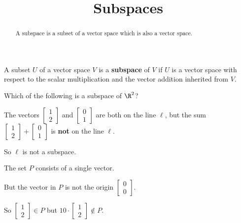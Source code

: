 \documentclass{ximera}
\title{Subspaces}
\begin{document}
\begin{abstract}
  A subspace is a subset of a vector space which is also a vector space.
\end{abstract}\maketitle

\begin{definition}
  A subset $U$ of a vector space $V$ is a \textbf{subspace} of $V$ if
  $U$ is a vector space with respect to the scalar multiplication and
  the vector addition inherited from $V$.
\end{definition}

\begin{question}
  Which of the following is a subspace of $\R^2$?
  \begin{solution}
    \begin{hint}
      The vectors $\begin{bmatrix} 1 \\ 2\end{bmatrix}$ and $\begin{bmatrix} 0 \\ 1\end{bmatrix}$ are both on the line $\ell$, but the sum $\begin{bmatrix} 1 \\ 2\end{bmatrix} + \begin{bmatrix} 0 \\ 1\end{bmatrix}$ is \textbf{not} on the line $\ell.$
    \end{hint}

    \begin{hint}
      So $\ell$ is not a subspace.
    \end{hint}

    \begin{hint}
      The set $P$ consists of a single vector.
    \end{hint}

    \begin{hint}
      But the vector in $P$ is not the origin $\begin{bmatrix} 0 \\ 0 \end{bmatrix}$.
    \end{hint}

    \begin{hint}
      So $\begin{bmatrix} 1 \\ 2 \end{bmatrix} \in P$ but $10 \cdot \begin{bmatrix} 1 \\ 2 \end{bmatrix} \not\in P$.
    \end{hint}


\end{solution}
\end{question}
\end{document}
